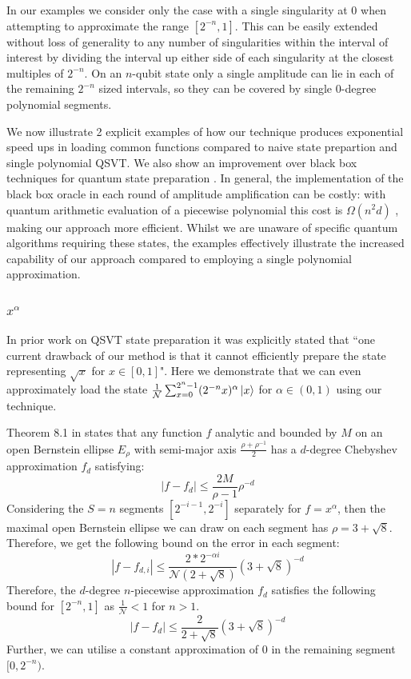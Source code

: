 \documentclass[a4paper,twocolumn,,accepted=2025-05-27]{quantumarticle}
\theoremstyle{empty}
\begin{document}
In our examples we consider only the case with a single singularity at $0$ when attempting to approximate the range $[2^{-n},1]$. This can be easily extended without loss of generality to any number of singularities within the interval of interest by dividing the interval up either side of each singularity at the closest multiples of $2^{-n}$. On an $n$-qubit state only a single amplitude can lie in each of the remaining $2^{-n}$ sized intervals, so they can be covered by single 0-degree polynomial segments.

We now illustrate 2 explicit examples of how our technique produces exponential speed ups in loading common functions compared to naive state prepartion and single polynomial QSVT. We also show an improvement over black box techniques for quantum state preparation \cite{Sanders_2020, Bausch:2020wxy}. In general, the implementation of the black box oracle in each round of amplitude amplification can be costly: with quantum arithmetic evaluation of a piecewise polynomial this cost is $\Omega(n^2d)$ \cite{Haner:2018yea}, making our approach more efficient.
Whilst we are unaware of specific quantum algorithms requiring these states, the examples effectively illustrate the increased capability of our approach compared to employing a single polynomial approximation.


\subsubsection{$x^{\alpha}$}
\label{section:sqrt}
In prior work \cite{mcardleQuantumStatePreparation2022} on QSVT state preparation it was explicitly stated that ``one current drawback of our method is that it cannot efficiently prepare the state representing $\sqrt{x}$ for $x \in [0, 1]$".
Here we demonstrate that we can even approximately load the state $\frac{1}{\mathcal{N}} \sum_{x=0}^{2^n-1} (2^{-n}x)^{\alpha} \ket{x}$ for $\alpha \in (0,1)$ using our technique.

Theorem 8.1 in \cite{Trefethen} states that any function $f$ analytic and bounded by $M$ on an open Bernstein ellipse $E_{\rho}$ with semi-major axis $\frac{\rho+\rho^{-1}}{2}$ has a $d$-degree Chebyshev approximation $f_d$ satisfying:
\begin{equation}
    |f - f_d| \leq \frac{2M}{\rho - 1}\rho^{-d}
\end{equation}
Considering the $S=n$ segments $[2^{-i-1}, 2^{-i}]$ separately for $f=x^{\alpha}$, then the maximal open Bernstein ellipse we can draw on each segment has $\rho = 3+\sqrt{8}$. Therefore, we get the following bound on the error in each segment:
\begin{equation}
    |f - f_{d,i}| \leq \frac{2*2^{-\alpha i}}{\mathcal{N}(2+ \sqrt{8})} (3+\sqrt{8})^{-d}
\end{equation}
Therefore, the $d$-degree $n$-piecewise approximation $f_{d}$ satisfies the following bound for $[2^{-n}, 1]$ as $\frac{1}{\mathcal{N}} < 1$ for $n>1$.
\begin{equation}
    |f - f_{d}| \leq \frac{2}{2+ \sqrt{8}} (3+\sqrt{8})^{-d}
\end{equation}
Further, we can utilise a constant approximation of $0$ in the remaining segment $[0, 2^{-n})$. 
\end{document}
